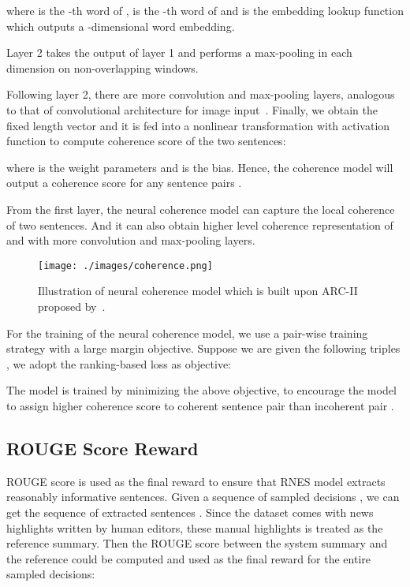 \documentclass[letterpaper]{article} \usepackage{aaai18}  \usepackage{times}  \usepackage{helvet}  \usepackage{courier}  \usepackage{url}  \usepackage{graphicx}  \usepackage{amssymb}
\begin{document}
	where  is the -th word of ,  is the -th word of  and  is the embedding lookup function which outputs a -dimensional word embedding.
	
	Layer 2 takes the output of layer 1 and performs a max-pooling in each dimension on non-overlapping  windows.
	
	
	Following layer 2, there are more convolution and  max-pooling layers, analogous to that of convolutional architecture for image input~\cite{cnn}. Finally, we obtain the fixed length vector  and it is fed into a nonlinear transformation with activation function  to compute coherence score of the two sentences:
	
	where  is the weight parameters and  is the bias. Hence, the coherence model will output a coherence score   for any sentence pairs .
	
	From the first layer, the neural coherence model can capture the local coherence of two sentences.  And it can also obtain higher level coherence representation of  and  with more convolution and max-pooling layers.
	
	\begin{figure}
		\texttt{[image: ./images/coherence.png]}
		\caption{Illustration of neural coherence model which is built upon ARC-II proposed by~\cite{NIPS2014_hu}.}
		\label{coherence}
	\end{figure}
	
	For the training of the neural coherence model, we use a pair-wise training strategy with a large margin objective. 
	Suppose we are given the following triples , we adopt the ranking-based loss as objective:
	
	The model is trained by minimizing the above objective, to encourage the model to assign higher coherence score to coherent sentence pair  than incoherent pair .
	


	
	\subsection{ROUGE Score Reward}
	\label{rsr}
	ROUGE score is used as the final reward to ensure that RNES model extracts reasonably informative sentences. Given a sequence of sampled decisions , we can get the sequence of extracted sentences . Since the dataset comes with news highlights written by human editors, these manual highlights  is treated as the reference summary. Then the ROUGE score between the system summary  and the reference   could be computed and used as the final reward for the entire sampled decisions:
	
\end{document}
